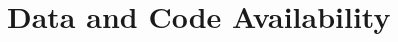 \documentclass[11pt]{article}
\begin{document}
\section{Data and Code Availability}


%
%




\end{document}

